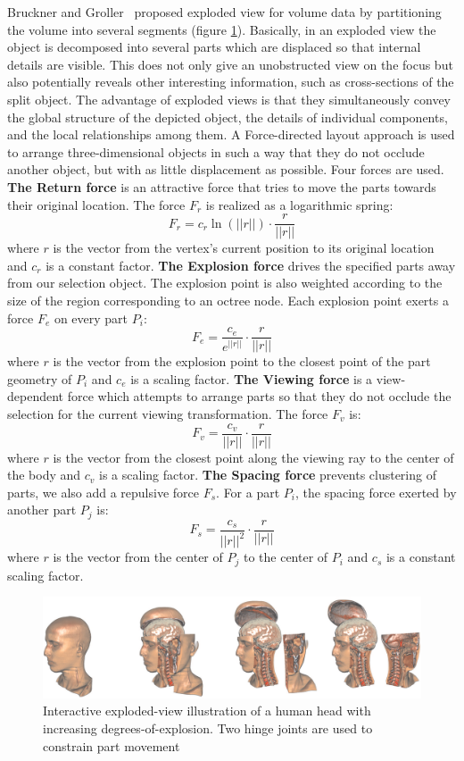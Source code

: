  Bruckner and  Groller~\cite{4015467} proposed exploded view for volume data by partitioning the volume into several segments (figure \ref{fig:exploded}). Basically, in an exploded view the object is decomposed into several parts which are displaced so that internal details are visible. This does not only give an unobstructed view on the focus but also potentially reveals other interesting information, such as
cross-sections of the split object. The advantage of exploded views is that they simultaneously convey the global structure of the depicted object, the details of individual components, and the local relationships
among them. A Force-directed layout approach is used to arrange three-dimensional objects
in such a way that they do not occlude another object, but with as little displacement as possible. Four forces are used. \textbf{The Return force } is an attractive force that tries to move the parts towards
their original location. The force $F_r$ is realized as a logarithmic spring:
 \[ F_r=c_{r}\ln(||r||)\cdot \frac{r}{||r||} \] 
 where $r$ is the vector from the vertex's current position to its original location and $c_r$ is a constant factor.
 \textbf{The Explosion force} drives the specified parts away from our selection object. The explosion point is also weighted according to the size of the region corresponding to an octree node. Each explosion point exerts a force $F_e$ on every part $P_i$:
  \[ F_e=  \frac{c_e}{e^{||r||} } \cdot \frac{r}{||r||} \]
  where $r$ is the vector from the explosion point to the closest point of the part geometry of $P_i$ and $c_e$ is a scaling factor.
   \textbf{The Viewing force} is a view-dependent force which attempts to arrange parts so that they do not occlude the selection for the current viewing transformation. The force $F_v$ is:
   \[ F_v=  \frac{c_v}{||r||} \cdot \frac{r}{||r||} \] 
   where $r$ is the vector from the closest point along the viewing ray to the center of the body and $c_v$ is a scaling factor.
   \textbf{The Spacing force} prevents clustering of parts, we also add a
repulsive force $F_s$. For a part $P_i$, the spacing force exerted by another part $P_j$ is:
\[ F_s=  \frac{c_s}{||r||^2} \cdot \frac{r}{||r||} \] 
where $r$ is the vector from the center of $P_j$ to the center of $P_i$ and
$c_s$ is a constant scaling factor. 
\begin{figure}
\centering
\includegraphics[width=\textwidth]{Figures/explodedview}
\decoRule
\caption[ Interactive exploded-view]{ Interactive exploded-view illustration of a human head with increasing degrees-of-explosion. Two hinge joints are used to constrain part
movement}
\label{fig:exploded}
\end{figure}

